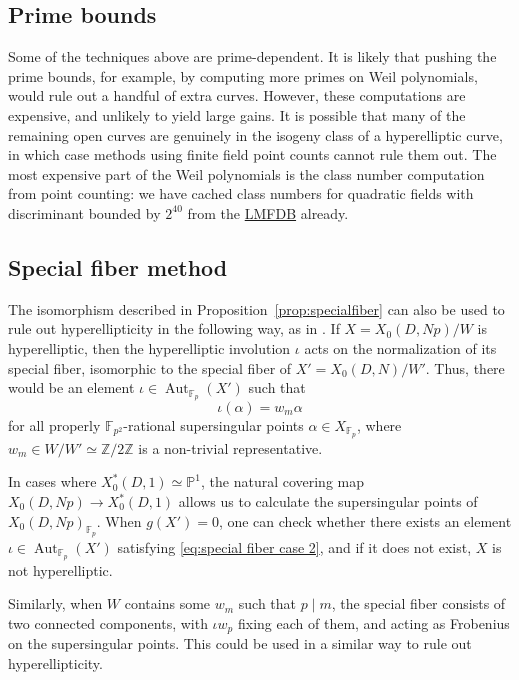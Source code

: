 \documentclass[12pt]{amsart}
\newcommand{\F}{\mathbb{F}}
\renewcommand{\P}{\mathbb{P}}
\newcommand{\Z}{\mathbb{Z}}
\DeclareMathOperator{\Aut}{Aut}
\numberwithin{equation}{subsection}
\theoremstyle{plain}\newtheorem{ithm}{Theorem}
\theoremstyle{plain}\newtheorem{iprop}[ithm]{Proposition}
\theoremstyle{definition}
\theoremstyle{remark}
\newcommand{\Curve}[2]{X_0({#1},{#2})} %
\newcommand{\StarCurve}[2]{X_0^*({#1},{#2})} %
\begin{document}
\subsection{Prime bounds}
Some of the techniques above are prime-dependent. It is likely that pushing the prime bounds, for example, by computing more primes on Weil polynomials, would rule out a handful of extra curves. 
However, these computations are expensive, and unlikely to yield large gains. It is possible that many of the remaining open curves are genuinely in the isogeny class of a hyperelliptic curve, in which case methods using finite field point counts cannot rule them out.
The most expensive part of the Weil polynomials is the class number computation from point counting: we have cached class numbers for quadratic fields with discriminant bounded by $2^{40}$ from the \href{https://www.lmfdb.org/NumberField/QuadraticImaginaryClassGroups}{LMFDB} \cite{lmfdb} already.

\subsection{Special fiber method}
The isomorphism described in Proposition~\ref{prop:specialfiber} can also be used to rule out hyperellipticity in the following way, as in \cite[\S 5]{FH99}. If $X = \Curve{D}{Np}/W$ is hyperelliptic, then the hyperelliptic involution $\iota$ acts on the normalization of its special fiber, isomorphic to the special fiber of $X' = \Curve{D}{N}/W'$. Thus, there would be an element $\iota \in \Aut_{\F_p}(X')$ such that 
\begin{equation} \label{eq:special fiber case 2}
\iota(\alpha) = w_m \alpha
\end{equation}
for all properly $\F_{p^2}$-rational supersingular points $\alpha \in X_{\F_p}$, where $w_m \in W/W' \simeq \Z / 2\Z$ is a non-trivial representative. 

In cases where $\StarCurve{D}{1} \simeq \P^1$, the natural covering map $\Curve{D}{Np} \to \StarCurve{D}{1}$ allows us to calculate the supersingular points of $\Curve{D}{Np}_{\F_p}$. When  $g(X') = 0$, one can check whether there exists an element $\iota \in \Aut_{\F_p}(X')$ satisfying \eqref{eq:special fiber case 2}, and if it does not exist, $X$ is not hyperelliptic.

Similarly, when $W$ contains some $w_m$ such that $p \mid m$, the special fiber consists of two connected components, with $\iota w_p$ fixing each of them, and acting as Frobenius on the supersingular points. This could be used in a similar way to rule out hyperellipticity.
\end{document}
